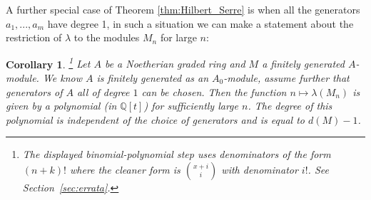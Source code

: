 \documentclass[12pt]{article}
\theoremstyle{plain}
\newtheorem{cor}[thm]{Corollary}
\theoremstyle{definition}
\newcommand{\bb}[1]{\mathbb{#1}}
\begin{document}
A further special case of Theorem \ref{thm:Hilbert_Serre} is when all the generators $a_1,...,a_m$ have degree 1, in such a situation we can make a statement about the restriction of $\lambda$ to the modules $M_n$ for large $n$:
\begin{cor}
\label{cor:polynomial}\footnote{The displayed binomial-polynomial step uses denominators of the form $(n+k)!$ where the cleaner form is $\binom{x+i}{i}$ with denominator $i!$. See Section~\ref{sec:errata}.}
Let $A$ be a Noetherian graded ring and $M$ a finitely generated $A$-module. We know $A$ is finitely generated as an $A_0$-module, assume further that generators of $A$ all of degree $1$ can be chosen. Then the function $n \mapsto \lambda(M_n)$ is given by a polynomial (in $\bb{Q}[t]$) for sufficiently large $n$. The degree of this polynomial is independent of the choice of generators and is equal to $d(M)-1$.
\end{cor}
\end{document}
